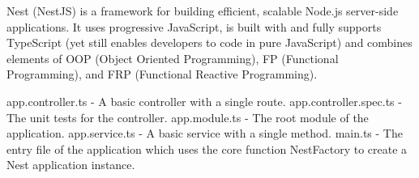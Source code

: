 
Nest (NestJS) is a framework for building efficient, scalable Node.js server-side applications. 
It uses progressive JavaScript, is built with and fully supports TypeScript (yet still enables developers to code in pure JavaScript) 
and combines elements of OOP (Object Oriented Programming), FP (Functional Programming), and FRP (Functional Reactive Programming).

app.controller.ts	- A basic controller with a single route.
app.controller.spec.ts	- The unit tests for the controller.
app.module.ts -	The root module of the application.
app.service.ts	- A basic service with a single method.
main.ts -	The entry file of the application which uses the core function NestFactory to create a Nest application instance.